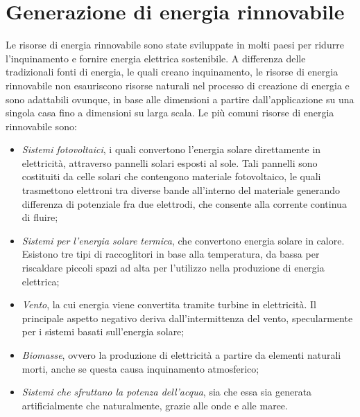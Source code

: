 \section{Generazione di energia rinnovabile}
Le risorse di energia rinnovabile sono state sviluppate in molti paesi per ridurre l'inquinamento e fornire energia elettrica sostenibile. A differenza delle tradizionali fonti di energia, le quali creano inquinamento, le risorse di energia rinnovabile non esauriscono risorse naturali nel processo di creazione di energia e sono adattabili ovunque, in base alle dimensioni a partire dall'applicazione su una singola casa fino a dimensioni su larga scala.
\newline
Le più comuni risorse di energia rinnovabile sono:
\begin{itemize}
	\item \emph{Sistemi fotovoltaici}, i quali convertono l'energia solare direttamente in elettricità, attraverso pannelli solari esposti al sole. Tali pannelli sono costituiti da celle solari che contengono materiale fotovoltaico, le quali trasmettono elettroni tra diverse bande all'interno del materiale generando differenza di potenziale fra due elettrodi, che consente alla corrente continua di fluire;
	\item \emph{Sistemi per l'energia solare termica}, che convertono energia solare in calore. Esistono tre tipi di raccoglitori in base alla temperatura, da bassa per riscaldare piccoli spazi ad alta per l'utilizzo nella produzione di energia elettrica;
	\item \emph{Vento}, la cui energia viene convertita tramite turbine in elettricità. Il principale aspetto negativo deriva dall'intermittenza del vento, specularmente per i sistemi basati sull'energia solare;
	\item \emph{Biomasse}, ovvero la produzione di elettricità a partire da elementi naturali morti, anche se questa causa inquinamento atmosferico;
	\item \emph{Sistemi che sfruttano la potenza dell'acqua}, sia che essa sia generata artificialmente che naturalmente, grazie alle onde e alle maree.   
\end{itemize} 

 
